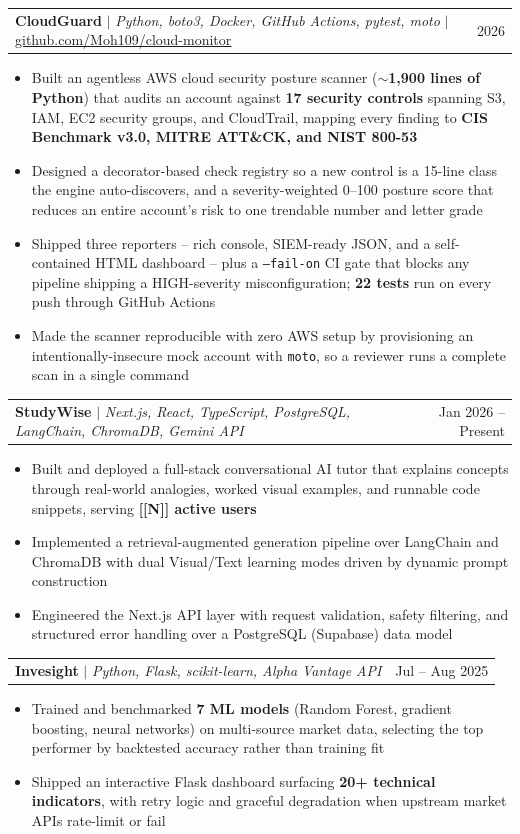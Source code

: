 \documentclass[letterpaper,11pt]{article}
\makeatletter
\newcommand{\resumeItem}[1]{
  \item\small{{#1 \vspace{-2pt}}}
}
\newcommand{\resumeProjectHeading}[2]{
    \item
    \begin{tabular*}{0.97\textwidth}{l@{\extracolsep{\fill}}r}
      \small#1 & #2 \\
    \end{tabular*}\vspace{-7pt}
}
\newcommand{\resumeItemListStart}{\begin{itemize}}
\newcommand{\resumeItemListEnd}{\end{itemize}\vspace{-5pt}}
\makeatother
\begin{document}
      \resumeProjectHeading
          {\textbf{CloudGuard} $|$ \emph{Python, boto3, Docker, GitHub Actions, pytest, moto} $|$ \href{https://github.com/Moh109/cloud-monitor}{\underline{github.com/Moh109/cloud-monitor}}}{2026}
          \resumeItemListStart
            \resumeItem{Built an agentless AWS cloud security posture scanner (\textbf{$\sim$1,900 lines of Python}) that audits an account against \textbf{17 security controls} spanning S3, IAM, EC2 security groups, and CloudTrail, mapping every finding to \textbf{CIS Benchmark v3.0, MITRE ATT\&CK, and NIST 800-53}}
            \resumeItem{Designed a decorator-based check registry so a new control is a 15-line class the engine auto-discovers, and a severity-weighted 0--100 posture score that reduces an entire account's risk to one trendable number and letter grade}
            \resumeItem{Shipped three reporters -- rich console, SIEM-ready JSON, and a self-contained HTML dashboard -- plus a \texttt{--fail-on} CI gate that blocks any pipeline shipping a HIGH-severity misconfiguration; \textbf{22 tests} run on every push through GitHub Actions}
            \resumeItem{Made the scanner reproducible with zero AWS setup by provisioning an intentionally-insecure mock account with \texttt{moto}, so a reviewer runs a complete scan in a single command}
          \resumeItemListEnd

      \resumeProjectHeading
          {\textbf{StudyWise} $|$ \emph{Next.js, React, TypeScript, PostgreSQL, LangChain, ChromaDB, Gemini API}}{Jan 2026 -- Present}
          \resumeItemListStart
            \resumeItem{Built and deployed a full-stack conversational AI tutor that explains concepts through real-world analogies, worked visual examples, and runnable code snippets, serving \textbf{[[N]] active users}}
            \resumeItem{Implemented a retrieval-augmented generation pipeline over LangChain and ChromaDB with dual Visual/Text learning modes driven by dynamic prompt construction}
            \resumeItem{Engineered the Next.js API layer with request validation, safety filtering, and structured error handling over a PostgreSQL (Supabase) data model}
          \resumeItemListEnd

      \resumeProjectHeading
          {\textbf{Invesight} $|$ \emph{Python, Flask, scikit-learn, Alpha Vantage API}}{Jul -- Aug 2025}
          \resumeItemListStart
            \resumeItem{Trained and benchmarked \textbf{7 ML models} (Random Forest, gradient boosting, neural networks) on multi-source market data, selecting the top performer by backtested accuracy rather than training fit}
            \resumeItem{Shipped an interactive Flask dashboard surfacing \textbf{20+ technical indicators}, with retry logic and graceful degradation when upstream market APIs rate-limit or fail}
          \resumeItemListEnd
\end{document}
